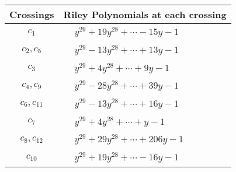 \documentclass[1p]{elsarticle_modified}
\theoremstyle{definition}
\begin{document}
\begin{tabular}{m{50pt}|m{274pt}}
Crossings & \hspace{64pt}Riley Polynomials at each crossing \\
\hline $$\begin{aligned}c_{1}\end{aligned}$$&$\begin{aligned}
&y^{29}+19 y^{28}+\cdots-15 y-1
\end{aligned}$\\
\hline $$\begin{aligned}c_{2},c_{5}\end{aligned}$$&$\begin{aligned}
&y^{29}-13 y^{28}+\cdots+13 y-1
\end{aligned}$\\
\hline $$\begin{aligned}c_{3}\end{aligned}$$&$\begin{aligned}
&y^{29}+4 y^{28}+\cdots+9 y-1
\end{aligned}$\\
\hline $$\begin{aligned}c_{4},c_{9}\end{aligned}$$&$\begin{aligned}
&y^{29}-28 y^{28}+\cdots+39 y-1
\end{aligned}$\\
\hline $$\begin{aligned}c_{6},c_{11}\end{aligned}$$&$\begin{aligned}
&y^{29}-13 y^{28}+\cdots+16 y-1
\end{aligned}$\\
\hline $$\begin{aligned}c_{7}\end{aligned}$$&$\begin{aligned}
&y^{29}+4 y^{28}+\cdots+y-1
\end{aligned}$\\
\hline $$\begin{aligned}c_{8},c_{12}\end{aligned}$$&$\begin{aligned}
&y^{29}+29 y^{28}+\cdots+206 y-1
\end{aligned}$\\
\hline $$\begin{aligned}c_{10}\end{aligned}$$&$\begin{aligned}
&y^{29}+19 y^{28}+\cdots-16 y-1
\end{aligned}$\\
\hline
\end{tabular}\\~\\
\end{document}
